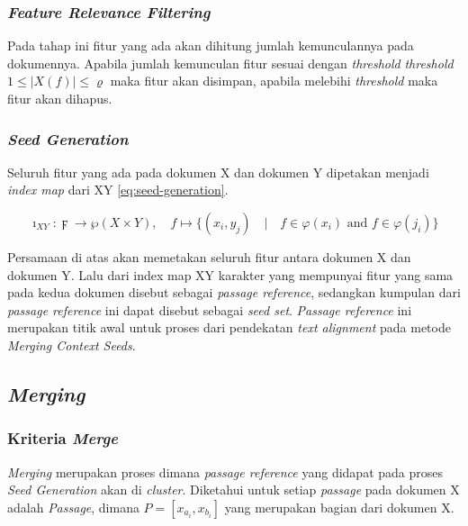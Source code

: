 \documentclass[../Proposal.tex]{subfiles}
\begin{document}
		\subsubsection{\textit{Feature Relevance Filtering}}
		Pada tahap ini fitur yang ada akan dihitung jumlah kemunculannya pada dokumennya. Apabila jumlah kemunculan fitur sesuai dengan \textit{threshold} \textit{threshold} $1 \leq |X(f)| \leq \varrho$ maka fitur akan disimpan, apabila melebihi \textit{threshold} maka fitur akan dihapus.

		\subsubsection{\textit{Seed Generation}}
		Seluruh fitur yang ada pada dokumen X dan dokumen Y dipetakan menjadi \textit{index map} dari XY \ref{eq:seed-generation}.

			\begin{center}
				\begin{equation}
					\imath_{XY} : \digamma \to \wp(X \times Y), \quad f \mapsto \{(x_{i}, y_{j}) \quad | \quad f \in \varphi(x_{i}) \text{ and } f \in \varphi(j_{i})\}
					\label{eq:seed-generation}
				\end{equation}
			\end{center}

		\noindent Persamaan di atas akan memetakan seluruh fitur antara dokumen X dan dokumen Y. Lalu dari index map XY karakter yang mempunyai fitur yang sama pada kedua dokumen disebut sebagai \textit{passage reference}, sedangkan kumpulan dari \textit{passage reference} ini dapat disebut sebagai \textit{seed set}. \textit{Passage reference} ini merupakan titik awal untuk proses \textit{} dari pendekatan \textit{text alignment} pada metode \textit{Merging Context Seeds}. 

		\subsection{\textit{Merging}}
		\subsubsection{Kriteria \textit{Merge}}
		\textit{Merging} merupakan proses dimana \textit{passage reference} yang didapat pada proses \textit{Seed Generation} akan di \textit{cluster}. Diketahui untuk setiap \textit{passage} pada dokumen X adalah \textit{Passage}, dimana $P = [ x_{a_{i}}, x_{b_{i}} ]$ yang merupakan bagian dari dokumen X. \\
		
\end{document}
